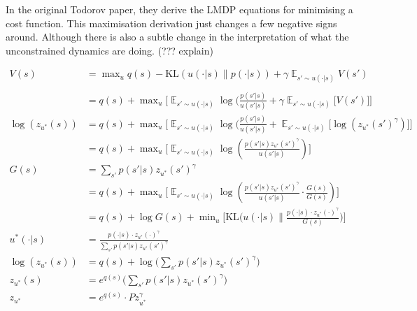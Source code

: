 In the original Todorov paper, they derive the LMDP equations for minimising a cost function. This maximisation derivation just changes a few negative signs around. Although there is also a subtle change in the interpretation of what the unconstrained dynamics are doing. (??? explain)

\begin{align}
V(s) &= \mathop{\text{max}}_{u} q(s) - \text{KL}(u(\cdot| s) \parallel p(\cdot | s)) + \gamma \mathop{\mathbb E}_{s' \sim u(\cdot | s)} V(s') \tag{1}\\
\\
&= q(s) + \mathop{\text{max}}_{u} \bigg[ \mathop{\mathbb E}_{s' \sim u(\cdot | s)} \log(\frac{p(s' | s) }{ u(s' | s)}+\gamma \mathop{\mathbb E}_{s' \sim u(\cdot | s)} \big[V(s')\big] \bigg] \tag{2}\\
\log(z_{u^{* }}(s)) &= q(s) + \mathop{\text{max}}_{u} \bigg[ \mathop{\mathbb E}_{s' \sim u(\cdot | s)} \log(\frac{p(s' | s) }{ u(s' | s)}+\mathop{\mathbb E}_{s' \sim u(\cdot | s)} \big[\log(z_{u^{* }}(s')^{\gamma})\big] \bigg] \tag{3}\\
&= q(s) + \mathop{\text{max}}_{u} \bigg[ \mathop{\mathbb E}_{s' \sim u(\cdot | s)} \log(\frac{p(s' | s)z_{u^{* }}(s')^{\gamma} }{ u(s' | s)} ) \bigg] \tag{4}\\
G(s) &= \sum_{s'} p(s' | s) z_{u^{* }}(s')^{\gamma} \tag{5}\\
&= q(s) + \mathop{\text{max}}_{u} \bigg[ \mathop{\mathbb E}_{s' \sim u(\cdot | s)} \log(\frac{p(s' | s)z_{u^{* }}(s')^{\gamma} }{ u(s' | s)} \cdot \frac{G(s)}{G(s)} ) \bigg] \tag{6}\\
&= q(s) + \log G(s) + \mathop{\text{min}}_{u} \bigg[\text{KL}\big(u(\cdot | s) \parallel \frac{p(\cdot | s)\cdot z_{u^{* }}(\cdot)^{\gamma}}{G(s)} \big) \bigg] \tag{7}\\
u^{* }(\cdot | s) &= \frac{p(\cdot | s)\cdot z_{u^{* }}(\cdot)^{\gamma}}{\sum_{s'} p(s' | s) z_{u^{* }}(s')^{\gamma}} \tag{8}\\
\log(z_{u^{* }}(s)) &= q(s) + \log \big(\sum_{s'} p(s' | s) z_{u^{* }}(s')^{\gamma}\big) \tag{9}\\
z_{u^{* }}(s) &= e^{q(s)}\big(\sum_{s'} p(s' | s) z_{u^{* }}(s')^{\gamma}\big) \tag{10}\\
z_{u^{* }} &= e^{q(s)}\cdot P z_{u^{* }}^{\gamma} \tag{11}\\
\end{align}

